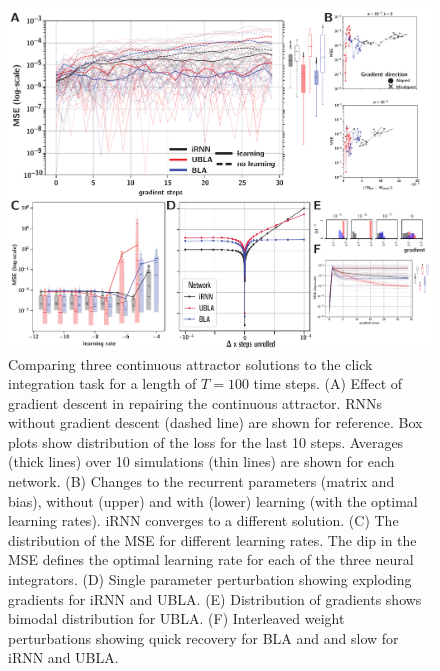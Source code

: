 \documentclass{article} %
\newcounter{ct}
\theoremstyle{definition}
\theoremstyle{remark}
\begin{document}
\begin{figure}[thbp]
  \centering
  \includegraphics[width=\textwidth]{maintenance_T100.pdf}
  \caption{
  Comparing three continuous attractor solutions to the click integration task for a length of $T=100$ time steps.
  (A) Effect of gradient descent in repairing the continuous attractor. RNNs without gradient descent (dashed line) are shown for reference. Box plots show distribution of the loss for the last 10 steps. Averages (thick lines) over 10 simulations (thin lines) are shown for each network.
  (B) Changes to the recurrent parameters (matrix and bias), without (upper) and with (lower) learning (with the optimal learning rates). iRNN converges to a different solution.
 (C)  The distribution of the MSE for different learning rates. The dip in the MSE defines the optimal learning rate for each of the three neural integrators. 
    (D) Single parameter perturbation showing exploding gradients for iRNN and UBLA.
  (E) Distribution of gradients shows bimodal distribution for UBLA. %
    (F) Interleaved weight perturbations showing quick recovery for BLA and and slow for iRNN and UBLA.
  }
  \label{fig:maintenance}
\end{figure}
\end{document}
